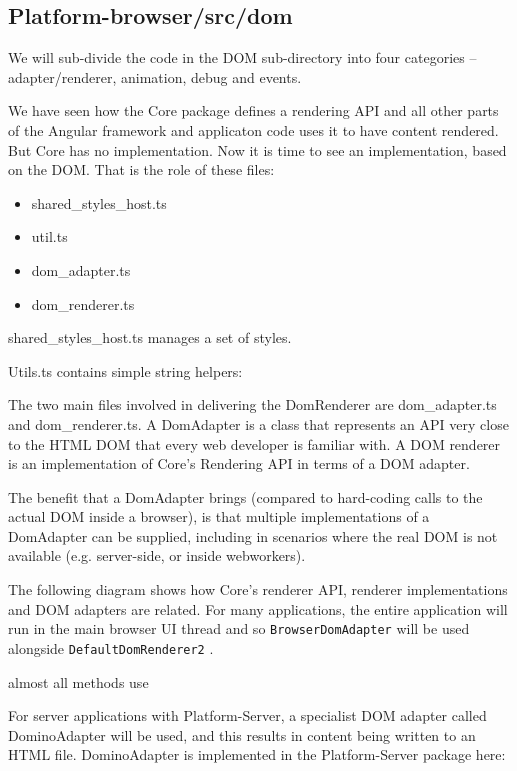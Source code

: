 \subsection{Platform-browser/src/dom}

We will sub-divide the code in the DOM sub-directory into four categories –
adapter/renderer, animation, debug and events.

We have seen how the Core package defines a rendering API and all other parts of the
Angular framework and applicaton code uses it to have content rendered. But Core
has no implementation. Now it is time to see an implementation, based on the DOM.
That is the role of these files:

\begin{itemize}
  \item shared\_styles\_host.ts
  \item util.ts
  \item dom\_adapter.ts
  \item dom\_renderer.ts
\end{itemize}

shared\_styles\_host.ts manages a set of styles.

Utils.ts contains simple string helpers:



The two main files involved in delivering the DomRenderer are dom\_adapter.ts and
dom\_renderer.ts. A DomAdapter is a class that represents an API very close to the
HTML DOM that every web developer is familiar with. A DOM renderer is an
implementation of Core’s Rendering API in terms of a DOM adapter.

The benefit that a DomAdapter brings (compared to hard-coding calls to the actual
DOM inside a browser), is that multiple implementations of a DomAdapter can be
supplied, including in scenarios where the real DOM is not available (e.g. server-side,
or inside webworkers).

The following diagram shows how Core’s renderer API, renderer implementations and
DOM adapters are related. For many applications, the entire application will run in the
main browser UI thread and so
\texttt{BrowserDomAdapter}
will be used alongside
\texttt{DefaultDomRenderer2}
.

{ almost all methods use }

For server applications with Platform-Server, a specialist DOM adapter called
DominoAdapter will be used, and this results in content being written to an HTML file.
DominoAdapter is implemented in the Platform-Server package here:

